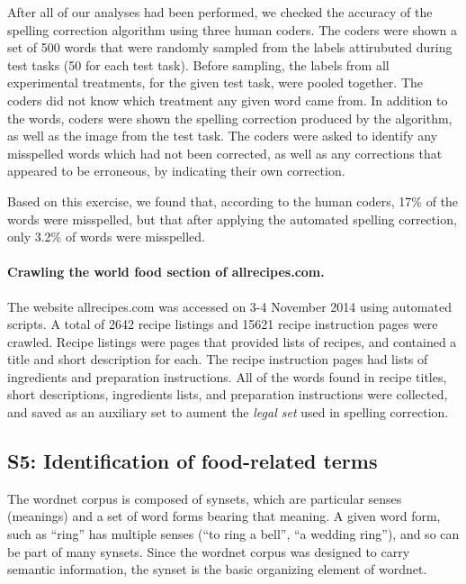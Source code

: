 \documentclass[12pt]{article}
\begin{document}
	After all of our analyses had been performed, we checked the accuracy of 
	the spelling correction algorithm using three human coders.  The coders
	were shown a set of 
	500 words that were randomly sampled from the labels attirubuted during 
	test tasks (50 for each test task).  Before sampling, the labels from all
	experimental treatments, for the given test task, were pooled together.
	The coders did not know which treatment any given word came from.  
	In addition to the words, coders were shown the spelling correction 
	produced by the algorithm, as well as the image from the test task.
	The coders were asked to identify any misspelled words which had not 
	been corrected, as well as any corrections that appeared to be erroneous,
	by indicating their own correction.

	Based on this exercise, we found that, according to the human coders,
	17\% of the words were misspelled, but that after applying the 
	automated spelling correction, only 3.2\% of words were misspelled.

	\paragraph{Crawling the world food section of allrecipes.com.}
	The website allrecipes.com was accessed on 3-4 November 2014 using 
	automated scripts.  A total of 2642 recipe listings and 15621 recipe
	instruction pages were crawled.  Recipe listings were pages that provided 
	lists of recipes, and contained a title and short description for each.  
	The recipe instruction pages had lists of ingredients and preparation 
	instructions.  All of the words found in recipe titles, short
	descriptions, ingredients lists, and preparation instructions were
	collected, and saved as an auxiliary set to aument the \textit{legal set}
	used in spelling correction.
	


\subsection*{S5: Identification of food-related terms}
The wordnet corpus is composed of synsets, which are particular senses 
(meanings) and a set of word forms bearing that meaning. A given word form, 
such as ``ring'' has multiple senses (``to ring a bell'', ``a wedding ring''), 
and so can be part of many synsets.  Since the wordnet corpus was designed
to carry semantic information, the synset is the basic organizing element
of wordnet.
\end{document}
